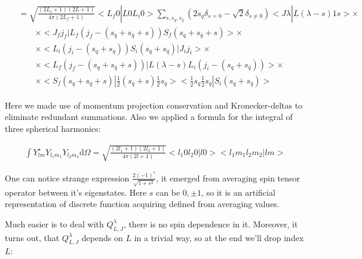 \begin{align}
\begin{split}
    \end{split} \\
    \begin{split}
        &= \sqrt{\frac{(2L_i + 1)(2L+1)}{4 \pi (2L_f + 1)}} < L_f 0 | L 0 L_i 0 > \sum_{s, s_{q}, s_{\overline{q}}} (2 s_q \delta_{s = 0} - \sqrt{2} \delta_{s \neq 0}) <J \lambda| L (\lambda - s) 1 s> \times\\
    &\qquad\times <J_f j_f| L_f (j_f-(s_q + s_{\overline{q}} + s)) S_f (s_q + s_{\overline{q}} + s)> \times \\
        &\qquad\times <L_i (j_i - (s_q + s_{\overline{q}})) S_i (s_q + s_{\overline{q}})| J_i j_i> \times \\
        &\qquad\times <L_f (j_f - (s_q + s_{\overline{q}} + s))| L (\lambda - s) L_i (j_i - (s_q + s_{\overline{q}}))>  \times\\
        &\qquad\times <S_f (s_q + s_{\overline{q}} + s)| \frac{1}{2} (s_{q}+s) \frac{1}{2} s_{\overline{q}}> <\frac{1}{2} s_{q} \frac{1}{2} s_{\overline{q}} |S_i (s_q + s_{\overline{q}})>
    \end{split}
\end{align}

Here we made use of momentum projection conservation and Kronecker-deltas to eliminate redundant summations. Also we applied a formula for the integral of three spherical harmonics:

\begin{align}
    \int Y^{\star}_{l m} Y_{l_1 m_1} Y_{l_2 m_2} \mathrm{d} \Omega = \sqrt{\frac{(2l_1+1)(2l_2+1)}{4 \pi (2l+1)}} <l_1 0 l_2 0 | l 0> <l_1 m_1 l_2 m_2 | l m>
\end{align}

One can notice strange expression $\frac{2 (-1)^s}{\sqrt{1+s^2}}$, it emerged from averaging spin tensor operator between it's eigenstates. Here $s$ can be $0, \pm1$, so it is an artificial representation of discrete function acquiring defined from averaging values.

Much easier is to deal with $Q_{L, J}^\lambda$, there is no spin dependence in it. Moreover, it turns out, that $Q_{L, J}^{\lambda}$ depends on $L$ in a trivial way, so at the end we'll drop index $L$:

